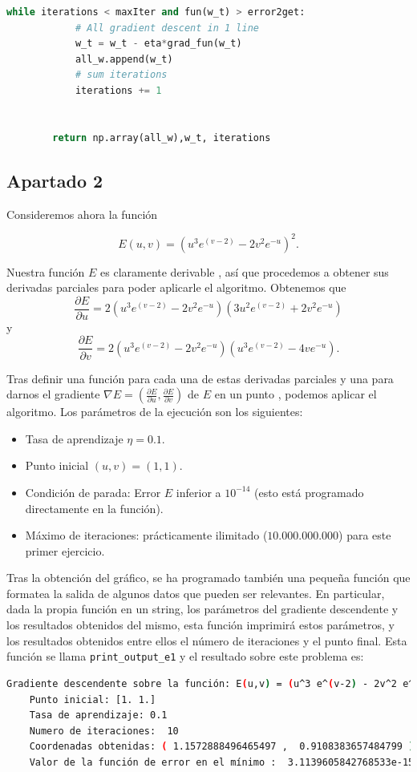 \documentclass[12pt]{scrartcl}
\begin{document}
{\begin{lstlisting}[language=Python]
	    while iterations < maxIter and fun(w_t) > error2get:
		    # All gradient descent in 1 line
		    w_t = w_t - eta*grad_fun(w_t)
		    all_w.append(w_t)
		    # sum iterations
		    iterations += 1
	

	    return np.array(all_w),w_t, iterations
\end{lstlisting}


\subsection*{Apartado 2}
Consideremos ahora la función

$$
E(u,v) = \left( u^3 e^{(v-2)} - 2v^2 e^{-u}\right)^2.
$$


Nuestra función $E$ es claramente derivable , así que procedemos a obtener sus derivadas parciales para poder aplicarle el algoritmo. Obtenemos que
$$
\frac{\partial E}{\partial u} = 2 \left( u^3 e^{(v-2)} - 2v^2 e^{-u}\right)\left( 3u^2 e^{(v-2)} + 2v^2 e^{-u}\right)
$$
y
$$
\frac{\partial E}{\partial v} = 2 \left( u^3 e^{(v-2)} - 2v^2 e^{-u}\right) \left( u^3 e^{(v-2)} - 4v e^{-u}\right).
$$

Tras definir una función para cada una de estas derivadas parciales y una para darnos el gradiente $\nabla E = \left(\frac{\partial E}{\partial u}, \frac{\partial E}{\partial v}\right)$ de $E$ en un punto
, podemos aplicar el algoritmo. Los parámetros de la ejecución son los siguientes:
\begin{itemize}
\item Tasa de aprendizaje $\eta = 0.1$.
\item Punto inicial $(u,v) = (1,1)$.
\item Condición de parada: Error $E$ inferior a $10^{-14}$ (esto está programado directamente en la función).
\item Máximo de iteraciones: prácticamente ilimitado ($10.000.000.000$) para este primer ejercicio.
\end{itemize}

Tras la obtención del gráfico, se ha programado también una pequeña función que formatea la salida de algunos datos que pueden ser relevantes.
En particular, dada la propia función en un string, los parámetros del gradiente descendente y los resultados obtenidos del mismo,
esta función imprimirá estos parámetros, y los resultados obtenidos entre ellos el número de iteraciones y el punto final. Esta función se llama \lstinline{print_output_e1}
y el resultado sobre este problema es:

\begin{lstlisting}[language=bash]
    Gradiente descendente sobre la función: E(u,v) = (u^3 e^(v-2) - 2v^2 e^(-u))^2
    Punto inicial: [1. 1.]
    Tasa de aprendizaje: 0.1
    Numero de iteraciones:  10
    Coordenadas obtenidas: ( 1.1572888496465497 ,  0.9108383657484799 )
    Valor de la función de error en el mínimo :  3.1139605842768533e-15
\end{lstlisting}

}
\end{document}
